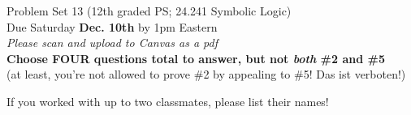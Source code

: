 \documentclass[12pt]{article}
\begin{document}

%
\newcommand{\detritus}[1]{}


\thispagestyle{empty}



\iffalse
\parindent = 0pt
\hspace*{0.0in}\parbox[t]{2.5in}{
Philosophy 24.241\\[3pt]
Symbolic Logic\\[3pt]
Fall, 2022
}
\fi 


\iffalse 
\begin{center}
\Large\bf Problem Set 12 \large{(24.241 Symbolic Logic)}\\[1ex] 
 Due Saturday {\bf{December 3rd}} by noon Eastern\\[3ex]
\end{center}
\fi

\begin{center}
\Large Problem Set 13 \large{(12th graded PS; 24.241 Symbolic Logic)} \\[1ex] 
 Due Saturday \textbf{Dec. 10th} by 1pm Eastern\\ \normalsize{\textit{Please scan and upload to Canvas as a pdf}}\\[1ex]  %
 
 \textbf{Choose FOUR questions total to answer, but not \textit{both} \#2 and \#5} \\ (at least, you're not allowed to prove \#2 by appealing to \#5! Das ist verboten!)
\end{center}




If you worked with up to two classmates, please list their names!

\medskip

\end{document}

